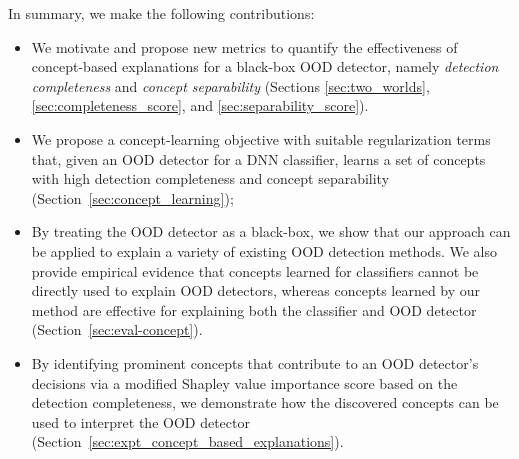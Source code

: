 In summary, we make the following contributions:
\begin{itemize} [leftmargin=*, topsep=1pt, noitemsep]
\item We motivate and propose new metrics to quantify the effectiveness of concept-based explanations for a black-box OOD detector, namely \textit{detection completeness} and \textit{concept separability} (Sections \ref{sec:two_worlds}, \ref{sec:completeness_score}, and \ref{sec:separability_score}).  
\item We propose a concept-learning objective with suitable regularization terms that, given an OOD detector for a DNN classifier, learns a set of concepts with high detection completeness and concept separability (Section~\ref{sec:concept_learning});
\item By treating the OOD detector as a black-box, we show that our approach can be applied to explain a variety of existing OOD detection methods.
We also provide empirical evidence that concepts learned for classifiers cannot be directly used to explain OOD detectors, whereas concepts learned by our method are effective for explaining both the classifier and OOD detector (Section~\ref{sec:eval-concept}).
\item By identifying prominent concepts that contribute to an OOD detector's decisions via a modified Shapley value importance score based on the detection completeness, we demonstrate how the discovered concepts can be used to interpret the OOD detector (Section~\ref{sec:expt_concept_based_explanations}).
\end{itemize}


